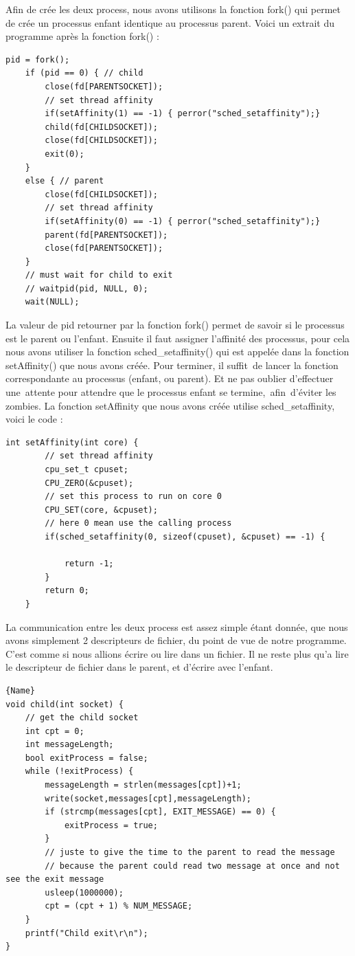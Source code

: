 \documentclass[
	a4paper, %
	10pt, %
]{CSUniSchoolLabReport}
\begin{document}
Afin de crée les deux process, nous avons utilisons la fonction fork() qui permet de crée un processus enfant identique au processus parent.
Voici un extrait du programme apr\`es la fonction fork() :
\begin{lstlisting}[style=CStyle, firstnumber=1]
	pid = fork();
    if (pid == 0) { // child 
        close(fd[PARENTSOCKET]); 
        // set thread affinity
        if(setAffinity(1) == -1) { perror("sched_setaffinity");}
        child(fd[CHILDSOCKET]);
        close(fd[CHILDSOCKET]);
        exit(0);
    }
    else { // parent 
        close(fd[CHILDSOCKET]);
        // set thread affinity
        if(setAffinity(0) == -1) { perror("sched_setaffinity");}
        parent(fd[PARENTSOCKET]);
        close(fd[PARENTSOCKET]);
    }
    // must wait for child to exit
    // waitpid(pid, NULL, 0);
    wait(NULL);
\end{lstlisting}
La valeur de pid retourner par la fonction fork() permet de savoir si le processus est le parent ou l'enfant.
Ensuite il faut assigner l'affinité des processus, pour cela nous avons utiliser la fonction sched\_setaffinity() qui est appelée dans la fonction setAffinity() que nous avons cré\'ee.
Pour terminer, il suffit\ de lancer la fonction correspondante au processus (enfant, ou parent).
Et ne pas oublier d'effectuer une\ attente pour attendre que le processus enfant se termine,\ afin\ d'\'eviter les zombies.
La fonction setAffinity que nous avons créée utilise sched\_setaffinity, voici le code : \\
\begin{lstlisting}[style=CStyle, firstnumber=1]
	int setAffinity(int core) {
		// set thread affinity
		cpu_set_t cpuset;
		CPU_ZERO(&cpuset);
		// set this process to run on core 0
		CPU_SET(core, &cpuset);
		// here 0 mean use the calling process
		if(sched_setaffinity(0, sizeof(cpuset), &cpuset) == -1) {
	
			return -1;
		}
		return 0;
	}
\end{lstlisting}
La communication entre les deux process est assez simple \'etant donnée, que nous avons simplement 2 descripteurs de fichier, du point de vue de notre programme. C'est comme si nous allions écrire ou lire dans un fichier.
Il ne reste plus qu'a lire le descripteur de fichier dans le parent, et d'écrire avec l'enfant.\\
\noindent\begin{minipage}{.50\textwidth}
\begin{lstlisting}[style=CStyle, caption=Processus Enfant, firstnumber=1]{Name}
void child(int socket) {
	// get the child socket
	int cpt = 0;
	int messageLength;
	bool exitProcess = false;
	while (!exitProcess) {
		messageLength = strlen(messages[cpt])+1;
		write(socket,messages[cpt],messageLength);
		if (strcmp(messages[cpt], EXIT_MESSAGE) == 0) {
			exitProcess = true;
		}
		// juste to give the time to the parent to read the message
		// because the parent could read two message at once and not see the exit message
		usleep(1000000); 
		cpt = (cpt + 1) % NUM_MESSAGE;
	}
	printf("Child exit\r\n");
}
\end{lstlisting}
\end{minipage}\hfill
\end{document}
